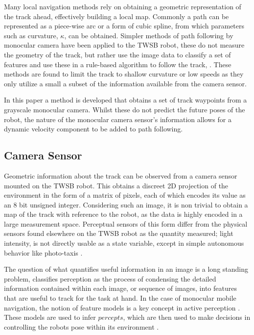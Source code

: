         Many local navigation methods rely on obtaining a geometric representation of the track ahead, effectively building a local map.
        Commonly a path can be represented as a piece-wise arc or a form of cubic spline, from which parameters such as curvature, $\kappa$, 
        can be obtained. Simpler methods of path following by monocular camera have been applied to the TWSB robot, these do not measure the 
        geometry of the track, but rather use the image data to classify a set of features and use these in a rule-based algorithm to follow the 
        track, \cite{visionlinetwsb} \cite{ismail2009vision} \cite{nntwsbvision}.
        These methods are found to limit the track to shallow curvature or low speeds as they only utilize a small 
        a subset of the information available from the camera sensor. 

        In this paper a method is developed that obtains a set of track waypoints from a grayscale monocular camera. 
        Whilst these do not predict the future poses of the robot, the nature of the 
        monocular camera sensor's information allows for a dynamic velocity component to be added to path following.

        \subsection{Camera Sensor}
        Geometric information about the track can be observed from a camera sensor mounted on the TWSB robot.
        This obtains a discreet 2D projection of the environment in the form of a matrix of pixels, each of which encodes 
        its value as an 8 bit unsigned integer. Considering such an image, it is non trivial to
        obtain a map of the track with reference to the robot, as the data is highly encoded in a large measurement space. 
        Perceptual sensors of this form differ from the physical sensors found elsewhere on the TWSB robot as the quantity measured; 
        light intensity, is not directly usable as a state variable, except in simple autonomous behavior like photo-taxis \cite{hasslacher1995living}. 

        The question of what quantifies useful information in an image is a long standing problem,  \cite{siegwart2011introduction} classifies 
        perception as the process of condensing the detailed information contained within each image, or sequence of images, 
        into features that are useful to track for the task at hand.
        In the case of monocular mobile navigation, the notion of feature models is a key concept in active perception \cite{Activeperception}.
        These models are used to infer $\textit{percepts}$, which are then used to make decisions in controlling the robots pose within its environment 
        \cite{hutchinson1996tutorial}. 

